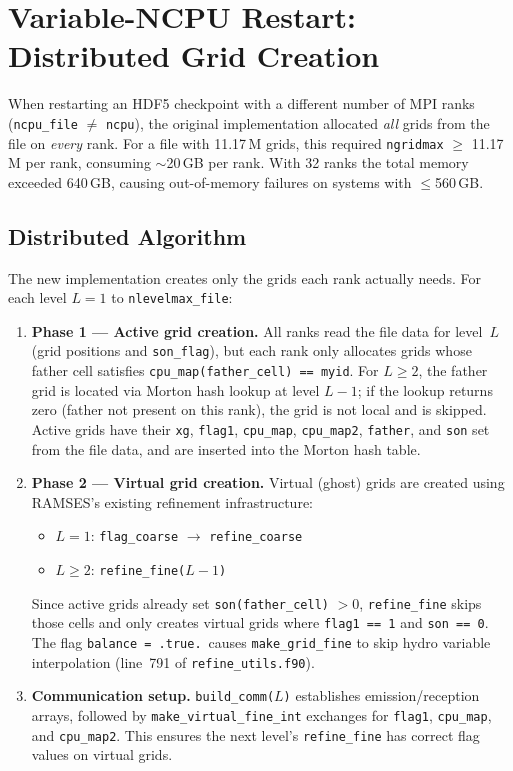 \documentclass[11pt,fleqn]{book}
\begin{document}
\section{Variable-NCPU Restart: Distributed Grid Creation}
\label{sec:varcpu-dist}

When restarting an HDF5 checkpoint with a different number of MPI ranks (\texttt{ncpu\_file} $\neq$ \texttt{ncpu}), the original implementation allocated \emph{all} grids from the file on \emph{every} rank.  For a file with 11.17\,M grids, this required \texttt{ngridmax} $\geq$ 11.17\,M per rank, consuming $\sim$20\,GB per rank.  With 32 ranks the total memory exceeded 640\,GB, causing out-of-memory failures on systems with $\leq$560\,GB.

\subsection{Distributed Algorithm}

The new implementation creates only the grids each rank actually needs.  For each level $L = 1$ to \texttt{nlevelmax\_file}:

\begin{enumerate}
  \item \textbf{Phase 1 --- Active grid creation.}
    All ranks read the file data for level~$L$ (grid positions and \texttt{son\_flag}), but each rank only allocates grids whose father cell satisfies \texttt{cpu\_map(father\_cell) == myid}.
    For $L \geq 2$, the father grid is located via Morton hash lookup at level $L-1$; if the lookup returns zero (father not present on this rank), the grid is not local and is skipped.
    Active grids have their \texttt{xg}, \texttt{flag1}, \texttt{cpu\_map}, \texttt{cpu\_map2}, \texttt{father}, and \texttt{son} set from the file data, and are inserted into the Morton hash table.

  \item \textbf{Phase 2 --- Virtual grid creation.}
    Virtual (ghost) grids are created using RAMSES's existing refinement infrastructure:
    \begin{itemize}
      \item $L = 1$: \texttt{flag\_coarse} $\to$ \texttt{refine\_coarse}
      \item $L \geq 2$: \texttt{refine\_fine($L-1$)}
    \end{itemize}
    Since active grids already set \texttt{son(father\_cell)} $> 0$, \texttt{refine\_fine} skips those cells and only creates virtual grids where \texttt{flag1 == 1} and \texttt{son == 0}.
    The flag \texttt{balance = .true.}\ causes \texttt{make\_grid\_fine} to skip hydro variable interpolation (line~791 of \texttt{refine\_utils.f90}).

  \item \textbf{Communication setup.}
    \texttt{build\_comm($L$)} establishes emission/reception arrays, followed by
    \texttt{make\_virtual\_fine\_int} exchanges for \texttt{flag1}, \texttt{cpu\_map}, and \texttt{cpu\_map2}.
    This ensures the next level's \texttt{refine\_fine} has correct flag values on virtual grids.
\end{enumerate}
\end{document}
